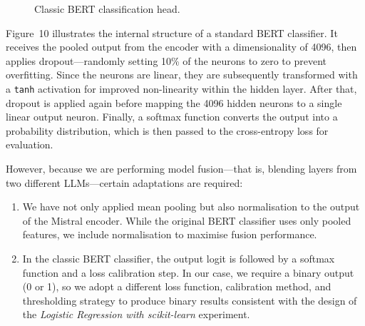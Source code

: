 \documentclass[12pt]{article}
\begin{document}
\begin{figure}[H]
\begin{adjustwidth}{-0.3cm}{0cm}
\begin{minipage}{1\textwidth}
\end{minipage}
\end{adjustwidth}
\caption{Classic BERT classification head.}
\label{fig:bert-classification-head}
\end{figure}

Figure~10 illustrates the internal structure of a standard BERT classifier. 
It receives the pooled output from the encoder with a dimensionality of 4096, then applies dropout\;---\;randomly setting 10\% of the neurons to zero to prevent overfitting. 
Since the neurons are linear, they are subsequently transformed with a \texttt{tanh} activation for improved non-linearity within the hidden layer. 
After that, dropout is applied again before mapping the 4096 hidden neurons to a single linear output neuron. 
Finally, a softmax function converts the output into a probability distribution, which is then passed to the cross-entropy loss for evaluation.

However, because we are performing model fusion\;---\;that is, blending layers from two different LLMs\;---\;certain adaptations are required:

\begin{enumerate}
  \item We have not only applied mean pooling but also normalisation to the output of the Mistral encoder. 
  While the original BERT classifier uses only pooled features, we include normalisation to maximise fusion performance.
  \item In the classic BERT classifier, the output logit is followed by a softmax function and a loss calibration step. 
  In our case, we require a binary output (0 or 1), so we adopt a different loss function, calibration method, and thresholding strategy to produce binary results consistent with the design of the \textit{Logistic Regression with scikit-learn} experiment.
\end{enumerate}
\end{document}
